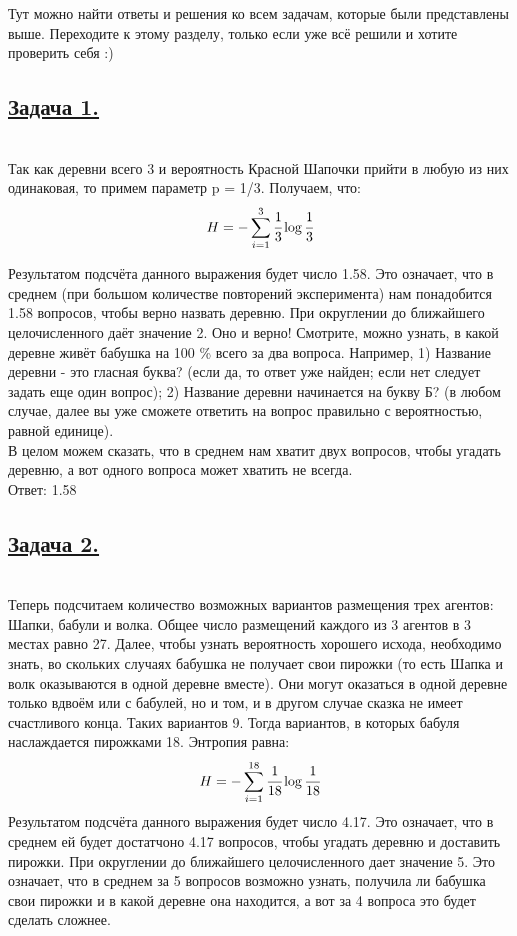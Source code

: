 Тут можно найти ответы и решения ко всем задачам, которые были представлены выше. Переходите к этому разделу, только если уже всё решили и хотите проверить себя :)

\subsection*{\hyperref[sec:problem1]{Задача 1.}}
\label{sec:sol_problem1}\
\\

Так как деревни всего 3 и вероятность Красной Шапочки прийти в любую из них одинаковая, то примем параметр p = 1/3. Получаем, что:
\[H=-\sum\limits_{i=1}^3 \cfrac{1}{3}\log \cfrac{1}{3} \]

Результатом подсчёта данного выражения будет число 1.58. Это означает, что в среднем (при большом количестве повторений эксперимента) нам понадобится 1.58 вопросов, чтобы верно назвать деревню. При округлении до ближайшего целочисленного даёт значение 2. Оно и верно! Смотрите, можно узнать, в какой деревне живёт бабушка на 100 \%  всего за два вопроса. Например, 1) Название деревни - это гласная буква? (если да, то ответ уже найден; если нет следует задать еще один вопрос); 2) Название деревни начинается на букву Б? (в любом случае, далее вы уже сможете ответить на вопрос правильно с вероятностью, равной единице).  \\
В целом можем сказать, что в среднем нам хватит двух вопросов, чтобы угадать деревню, а вот одного вопроса может хватить не всегда. \\

Ответ: 1.58
\subsection*{\hyperref[sec:problem2]{Задача 2.}}
\label{sec:sol_problem2}\
\\

Теперь подсчитаем количество возможных вариантов размещения трех агентов: Шапки, бабули и волка. Общее число размещений каждого из 3 агентов в 3 местах равно 27. 
Далее, чтобы узнать вероятность хорошего исхода, необходимо знать, во скольких случаях бабушка не получает свои пирожки (то есть Шапка и волк оказываются в одной деревне вместе). Они могут оказаться в одной деревне только вдвоём или с бабулей, но и том, и в другом случае сказка не имеет счастливого конца. Таких вариантов 9. Тогда вариантов, в которых бабуля наслаждается пирожками 18.
Энтропия равна:
\[H=-\sum\limits_{i=1}^{18}  \cfrac{1}{18}\log \cfrac{1}{18} \]
Результатом подсчёта данного выражения будет число 4.17. Это означает, что в среднем ей будет достатчоно 4.17 вопросов, чтобы угадать деревню и доставить пирожки. При округлении до ближайшего целочисленного дает значение 5. Это означает, что в среднем за 5 вопросов возможно узнать, получила ли бабушка свои пирожки и в какой деревне она находится, а вот за 4 вопроса это будет сделать сложнее. \\ 

